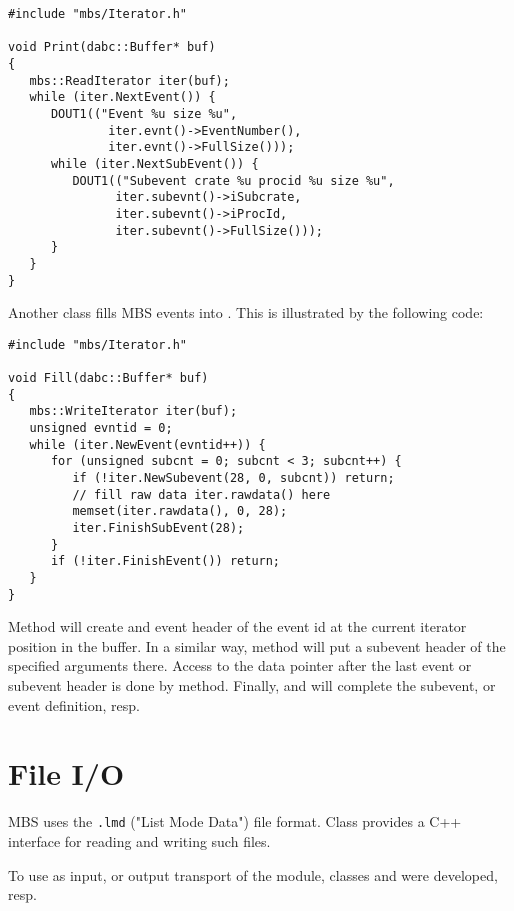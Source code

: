 \begin{small}
\begin{verbatim}
#include "mbs/Iterator.h"

void Print(dabc::Buffer* buf)
{
   mbs::ReadIterator iter(buf);
   while (iter.NextEvent()) {
      DOUT1(("Event %u size %u", 
              iter.evnt()->EventNumber(), 
              iter.evnt()->FullSize()));
      while (iter.NextSubEvent()) {
         DOUT1(("Subevent crate %u procid %u size %u",
               iter.subevnt()->iSubcrate, 
               iter.subevnt()->iProcId, 
               iter.subevnt()->FullSize()));
      }
   }
}
\end{verbatim}
\end{small}

Another class  fills 
MBS events into . 
This is illustrated by the following code:

\begin{small}
\begin{verbatim}
#include "mbs/Iterator.h"

void Fill(dabc::Buffer* buf)
{
   mbs::WriteIterator iter(buf);
   unsigned evntid = 0;
   while (iter.NewEvent(evntid++)) {
      for (unsigned subcnt = 0; subcnt < 3; subcnt++) {
         if (!iter.NewSubevent(28, 0, subcnt)) return;
         // fill raw data iter.rawdata() here
         memset(iter.rawdata(), 0, 28);
         iter.FinishSubEvent(28);
      } 
      if (!iter.FinishEvent()) return;
   }
}
\end{verbatim}
\end{small}

Method  will create and event header of the event id
 at the current iterator position in the buffer. 
In a similar way, method 
will put a subevent header of the specified arguments there. Access to the
data pointer after the last event or subevent header is done by
 method. Finally,  and
 will complete the subevent, or event definition, resp.

\section{File I/O}
MBS uses the {\tt .lmd}  ("List Mode Data") file format. 
Class  provides a
C++ interface for reading and writing such files.

To use  as input, or output transport of the module, 
classes  
and  were developed, resp. 

